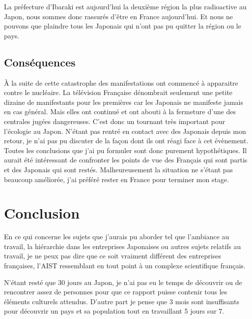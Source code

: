 \documentclass[11pt,journal]{RapportFR}
\begin{document}
\begin{CJK*}{UTF8}{min}
La pr\'efecture d'Ibaraki est aujourd'hui la deuxi\`eme r\'egion la plus radioactive au Japon, nous sommes donc rassur\'es d'\^etre en France aujourd'hui. Et nous ne pouvons que plaindre tous les Japonais qui n'ont pas pu quitter la r\'egion ou le pays.


\subsection{Cons\'equences}

\`A la suite de cette catastrophe des manifestations ont commenc\'e \`a apparaitre contre le nucl\'eaire. La t\'el\'evision Fran\c{c}aise d\'enombrait seulement une petite dizaine de manifestants pour les premi\`eres car les Japonais ne manifeste jamais en cas g\'en\'eral. Mais elles ont continu\'e et ont abouti \`a la fermeture d'une des centrales jug\'ees dangereuses. C'est donc un tournant tr\`es important pour l'\'ecologie au Japon. 
N'\'etant pas rentr\'e en contact avec des Japonais depuis mon retour, je n'ai pas pu discuter de la fa\c{c}on dont ils ont r\'eagi face \`a cet \'ev\`enement. Toutes les conclusions que j'ai pu formuler sont donc purement hypoth\'etiques. Il aurait \'et\'e int\'eressant de confronter les points de vue des Fran\c{c}ais qui sont partis et des Japonais qui sont rest\'es. Malheureusement la situation ne s'\'etant pas beaucoup am\'elior\'ee, j'ai pr\'ef\'er\'e rester en France pour terminer mon stage.


\section{Conclusion}

En ce qui concerne les sujets que j'aurais pu aborder tel que l'ambiance au travail, la hi\'erarchie dans les entreprises Japonaises ou autres sujets relatifs au travail, je ne peux pas dire que ce soit vraiment diff\'erent des entreprises fran\c{c}aises, l'AIST ressemblant en tout point \`a un complexe scientifique fran\c{c}ais.

N'\'etant rest\'e que 30 jours au Japon, je n'ai pas eu le temps de d\'ecouvrir ou de rencontrer assez de personnes pour que ce rapport puisse contenir tous les \'el\'ements culturels attendus. D'autre part je pense que 3 mois sont insuffisants pour d\'ecouvrir un pays et sa population tout en travaillant 5 jours sur 7.



\end{CJK*}
\end{document}
